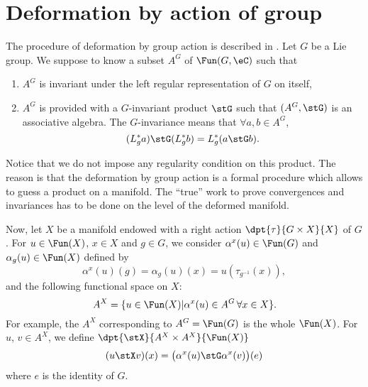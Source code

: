 
\section{Deformation by action of group}    \label{SecDefAction}        %

The procedure of deformation by group action is described in \cite{TrsStProd}. Let $G$ be a Lie group. We suppose to know a subset $A^G$ of $\Fun(G,\eC)$  such that
\begin{enumerate}
	\item $A^G$ is invariant under the left regular representation of $G$ on itself,
	\item $A^G$ is provided with a $G$-invariant product $\stG$ such that $(A^G,\stG)$ is an associative algebra. The $G$-invariance means that $\forall a,b\in A^G$,
	      \[
		      (L^*_ga)\stG(L^*_gb)=L^*_g(a\stG b).
	      \]
\end{enumerate}

Notice that we do not impose any regularity condition on this product. The reason is that the deformation by group action is a formal procedure which allows to guess a product on a manifold. The ``true'' work to prove convergences and invariances has to be done on the level of the deformed manifold.

Now, let $X$ be a manifold endowed with a right action  $\dpt{\tau}{G\times X}{X}$ of $G$.  For $u\in\Fun(X)$, $x\in X$ and $g\in G$, we consider $\alpha^x(u)\in\Fun(G)$ and $\alpha_g(u)\in\Fun(X)$ defined by
\begin{equation}        \label{EqDefalphaxu}
	\alpha^x(u)(g)=\alpha_g(u)(x)=u(\tau_{g^{-1}}(x)),
\end{equation}
and the following functional space on $X$:
\[
	A^X=\{u\in\Fun(X)|\alpha^x(u)\in A^G\,\forall x\in X\}.
\]
For example, the $A^X$ corresponding to $A^G=\Fun(G)$ is the whole $\Fun(X)$.  For $u$, $v\in A^X$, we define $\dpt{\stX}{A^X\times A^X}{\Fun(X)}$
\begin{equation}\label{eq:def_stG}
	(u\stX v)(x)=\big(\alpha^x(u)\stG \alpha^x(v)\big)(e)
\end{equation}
where $e$ is the identity of $G$.


